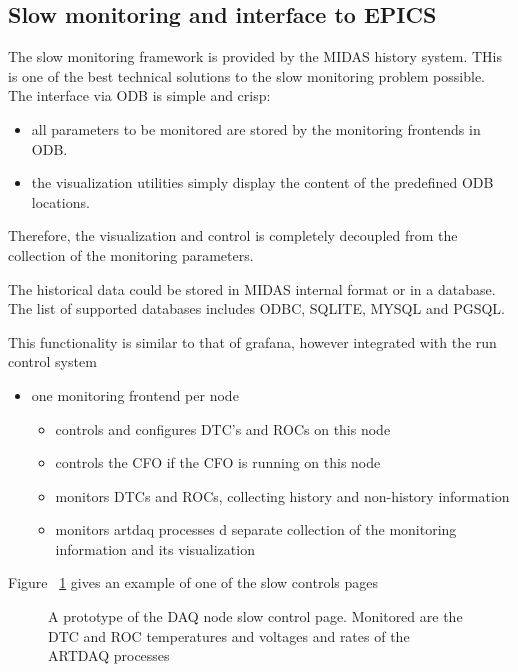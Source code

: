 \subsection{Slow monitoring and interface to EPICS}

The slow monitoring framework is provided by the MIDAS history system.
THis is one of the best technical solutions to the slow monitoring problem possible.
The interface via ODB is simple and crisp:
\begin{itemize}
\item
  all parameters to be monitored are stored by the monitoring frontends in ODB.
\item
  the visualization utilities simply display the content of the predefined ODB locations.
\end{itemize}

Therefore, the visualization and control is completely decoupled from the collection of the
monitoring parameters.

The historical data could be stored in  MIDAS internal format or in a database.
The list of supported databases includes ODBC, SQLITE, MYSQL and PGSQL.

This functionality is similar to that of grafana, however integrated with the
run control system

\begin{itemize}
\item
  one monitoring frontend per node 
  \begin{itemize}
  \item
    controls and configures DTC's and ROCs on this node
  \item
    controls the CFO if the CFO is running on this node
  \item
    monitors DTCs and ROCs, collecting history and non-history information
  \item
    monitors artdaq processes d separate collection of the monitoring information and its visualization
  \end{itemize}
\end{itemize}

Figure ~\ref{figure:slow_controls_node_page} gives an example of one of the slow controls pages

\begin{figure}[H]
  \caption{
    \label{figure:slow_controls_node_page}
    A prototype of the DAQ node slow control page. Monitored are the DTC and ROC temperatures and voltages
    and rates of the ARTDAQ processes
  }
\end{figure}


